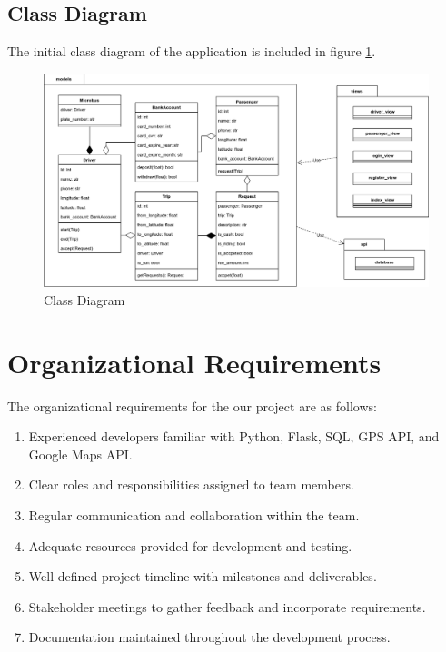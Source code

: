 \documentclass{BusMateSRS}
\begin{document}
\pagebreak

\subsection{Class Diagram}
The initial class diagram of the application is included in figure
\ref{fig:class-diagram}.

\begin{figure}[ht!]
	\begin{center}
		\includegraphics[width=\columnwidth]{drawings/class-diagram.drawio.png}
	\end{center}
	\caption{Class Diagram}
	\label{fig:class-diagram}
\end{figure}

\pagebreak


\section{Organizational Requirements}
The organizational requirements for the our project are as follows:

\begin{enumerate}
	\item Experienced developers familiar with Python, Flask, SQL,
	      GPS API, and Google Maps API.
	\item Clear roles and responsibilities assigned to team members.
	\item Regular communication and collaboration within the team.
	\item Adequate resources provided for development and testing.
	\item Well-defined project timeline with milestones and deliverables.
	\item Stakeholder meetings to gather feedback and incorporate requirements.
	\item Documentation maintained throughout the development process.
\end{enumerate}


\end{document}
